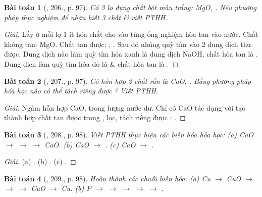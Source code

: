 \documentclass{article}
\newtheorem{baitoan}{Bài toán}
\begin{document}
\begin{baitoan}[\cite{Nguyen_Buu_Can_500_BT_Hoa_Hoc_THCS}, 206., p. 97]
	Có 3 lọ đựng chất bột màu trắng: {\rm MgO, }. Nêu phương pháp thực nghiệm để nhận biết 3 chất \& viết {\rm PTHH}.
\end{baitoan}

\begin{proof}[Giải]
	Lấy ở mỗi lọ 1 ít hóa chất cho vào từng ống nghiệm hòa tan vào nước. Chất không tan: MgO. Chất tan được: , . Sau đó nhúng quỳ tím vào 2 dung dịch thu được. Dung dịch nào làm quỳ tím hóa xanh là dung dịch NaOH, chất hòa tan là . Dung dịch làm quỳ tím hóa đỏ là  \& chất hòa tan là .
\end{proof}

\begin{baitoan}[\cite{Nguyen_Buu_Can_500_BT_Hoa_Hoc_THCS}, 207., p. 97]
	Có hỗn hợp 2 chất rắn là {\rm CaO, }. Bằng phương pháp hóa học nào có thể tách riêng được {\rm{}}? Viết {\rm PTHH}.
\end{baitoan}

\begin{proof}[Giải]
	Ngâm hỗn hợp CaO,  trong lượng nước dư. Chỉ có CaO tác dụng với  tạo thành hợp chất tan được trong , lọc, tách riêng được : . 
\end{proof}

\begin{baitoan}[\cite{Nguyen_Buu_Can_500_BT_Hoa_Hoc_THCS}, 208., p. 98]
	Viết {\rm PTHH} thực hiện các biến hóa hóa học: {\rm(a) CaO $\to$  $\to$  $\to$ CaO. (b) CaO $\to$ . (c) CaO $\to$ }.
\end{baitoan}

\begin{proof}[Giải]
	(a) . (b) . (c) .
\end{proof}

\begin{baitoan}[\cite{Nguyen_Buu_Can_500_BT_Hoa_Hoc_THCS}, 209., p. 98]
	Hoàn thành các chuỗi biến hóa: {\rm(a) Cu $\to$ CuO $\to$  $\to$  $\to$ CuO $\to$ Cu. (b) P $\to$  $\to$  $\to$  $\to$  $\to$ }.
\end{baitoan}
\end{document}
